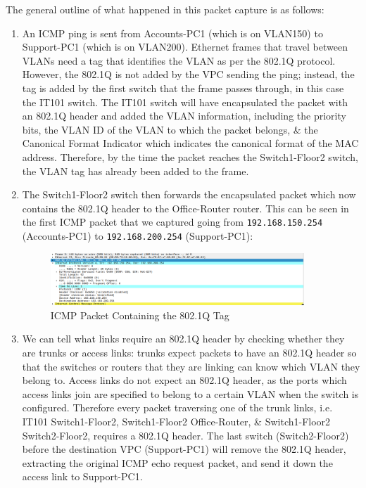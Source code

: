 \documentclass[a4paper]{article}
\begin{document}
The general outline of what happened in this packet capture is as follows:
\begin{enumerate}
    \item   An ICMP ping is sent from Accounts-PC1 (which is on VLAN150) to Support-PC1 (which is on VLAN200).
            Ethernet frames that travel between VLANs need a tag that identifies the VLAN as per the 802.1Q protocol.
            However, the 802.1Q is not added by the VPC sending the ping; instead, the tag is added by the first switch that the frame passes through, in this case 
            the IT101 switch.
            The IT101 switch will have encapsulated the packet with an 802.1Q header and added the VLAN information, including the priority bits, the VLAN ID of the 
            VLAN to which the packet belongs, \& the Canonical Format Indicator which indicates the canonical format of the MAC address.
            Therefore, by the time the packet reaches the Switch1-Floor2 switch, the VLAN tag has already been added to the frame. 

    \item   The Switch1-Floor2 switch then forwards the encapsulated packet which now contains the 802.1Q header to the Office-Router router.
            This can be seen in the first ICMP packet that we captured going from \verb|192.168.150.254| (Accounts-PC1) to \verb|192.168.200.254| (Support-PC1): 
            \begin{figure}[H]
                \centering
                \includegraphics[width=0.9\textwidth]{./images/dot1q_tag.png}
                \caption{ICMP Packet Containing the 802.1Q Tag}
            \end{figure}

    \item   We can tell what links require an 802.1Q header by checking whether they are trunks or access links: trunks expect packets to have an 802.1Q header so 
            that the switches or routers that they are linking can know which VLAN they belong to.
            Access links do not expect an 802.1Q header, as the ports which access links join are specified to belong to a certain VLAN when the switch is configured.
            Therefore every packet traversing one of the trunk links, i.e. IT101 {\leftrightarrow} Switch1-Floor2, Switch1-Floor2 {\leftrightarrow} Office-Router,
            \& Switch1-Floor2 {\leftrightarrow} Switch2-Floor2, requires a 802.1Q header.   
            The last switch (Switch2-Floor2) before the destination VPC (Support-PC1) will remove the 802.1Q header, extracting the original ICMP echo request packet, and send it
            down the access link to Support-PC1.


\end{enumerate}
\end{document}
